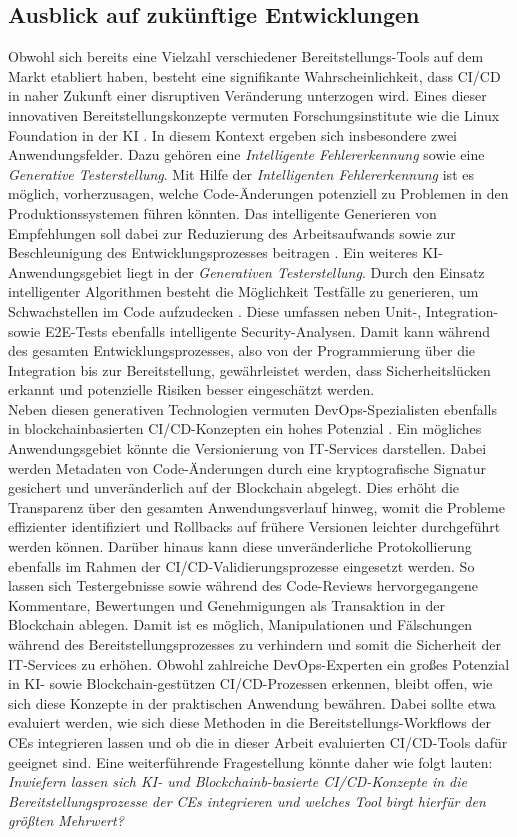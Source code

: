 \subsection{Ausblick auf zukünftige Entwicklungen}

Obwohl sich bereits eine Vielzahl verschiedener Bereitstellungs-Tools auf dem Markt etabliert haben, besteht eine signifikante Wahrscheinlichkeit, dass CI/CD in naher Zukunft einer disruptiven Veränderung unterzogen wird. Eines dieser innovativen Bereitstellungskonzepte vermuten Forschungsinstitute wie die Linux Foundation in der KI \cite{Foundation.2022}. In diesem Kontext ergeben sich insbesondere zwei Anwendungsfelder. Dazu gehören eine \textit{Intelligente Fehlererkennung} sowie eine \textit{Generative Testerstellung}. Mit Hilfe der \textit{Intelligenten Fehlererkennung} ist es möglich, vorherzusagen, welche Code-Änderungen potenziell zu Problemen in den Produktionssystemen führen könnten. Das intelligente Generieren von Empfehlungen soll dabei zur Reduzierung des Arbeitsaufwands sowie zur Beschleunigung des Entwicklungsprozesses beitragen \cite{.20230419d}. Ein weiteres KI-Anwendungsgebiet liegt in der \textit{Generativen Testerstellung}. Durch den Einsatz intelligenter Algorithmen besteht die Möglichkeit Testfälle zu generieren, um Schwachstellen im Code aufzudecken \cite{Fernandes.20210223}. Diese umfassen neben Unit-, Integration- sowie E2E-Tests ebenfalls intelligente Security-Analysen. Damit kann während des gesamten Entwicklungsprozesses, also von der Programmierung über die Integration bis zur Bereitstellung, gewährleistet werden, dass Sicherheitslücken erkannt und potenzielle Risiken besser eingeschätzt werden.\\ Neben diesen generativen Technologien vermuten DevOps-Spezialisten ebenfalls in blockchainbasierten CI/CD-Konzepten ein hohes Potenzial \cite{.20230424}. Ein mögliches Anwendungsgebiet könnte die Versionierung von IT-Services darstellen. Dabei werden Metadaten von Code-Änderungen durch eine kryptografische Signatur gesichert und unveränderlich auf der Blockchain abgelegt. Dies erhöht die Transparenz über den gesamten Anwendungsverlauf hinweg, womit die Probleme effizienter identifiziert und Rollbacks auf frühere Versionen leichter durchgeführt werden können. Darüber hinaus kann diese unveränderliche Protokollierung ebenfalls im Rahmen der CI/CD-Validierungsprozesse eingesetzt werden. So lassen sich Testergebnisse sowie während des Code-Reviews hervorgegangene Kommentare, Bewertungen und Genehmigungen als Transaktion in der Blockchain ablegen. Damit ist es möglich, Manipulationen und Fälschungen während des Bereitstellungsprozesses zu verhindern und somit die Sicherheit der IT-Services zu erhöhen. Obwohl zahlreiche DevOps-Experten ein großes Potenzial in KI- sowie Blockchain-gestützen CI/CD-Prozessen erkennen, bleibt offen, wie sich diese Konzepte in der praktischen Anwendung bewähren. Dabei sollte etwa evaluiert werden, wie sich diese Methoden in die Bereitstellungs-Workflows der CEs integrieren lassen und ob die in dieser Arbeit evaluierten CI/CD-Tools dafür geeignet sind. Eine weiterführende Fragestellung könnte daher wie folgt lauten:\\
\textit{Inwiefern lassen sich KI- und Blockchainb-basierte CI/CD-Konzepte in die Bereitstellungsprozesse der CEs integrieren und welches Tool birgt hierfür den größten Mehrwert?}
